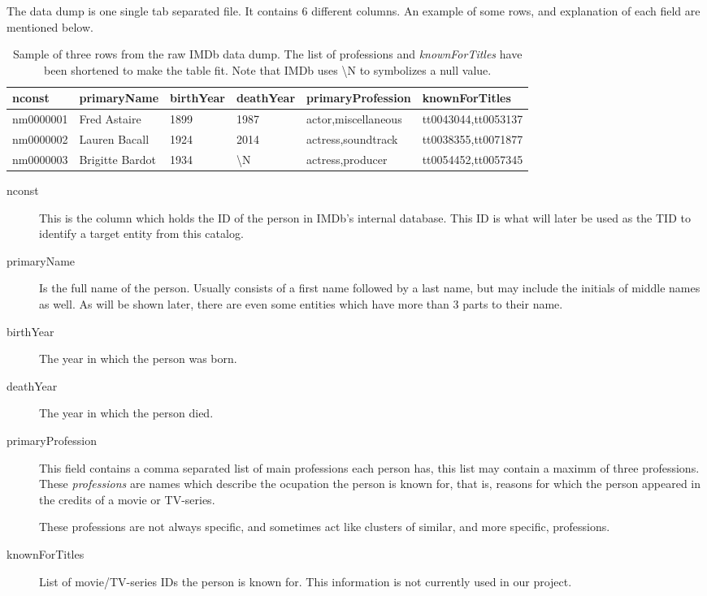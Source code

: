 \documentclass[epsfig,a4paper,11pt,titlepage,twoside,openany]{book}
\begin{document}
The data dump is one single tab separated file. It contains 6 different columns. An example of some rows, and explanation of each field are mentioned below.

\begin{table}[H]
\centering
\begin{tabular}{l|l|l|l|l|l}
nconst    & primaryName     & birthYear & deathYear         & primaryProfession              & knownForTitles                          \\ \hline
nm0000001 & Fred Astaire    & 1899      & 1987              & actor,miscellaneous & tt0043044,tt0053137 \\
nm0000002 & Lauren Bacall   & 1924      & 2014              & actress,soundtrack             & tt0038355,tt0071877 \\
nm0000003 & Brigitte Bardot & 1934      & \textbackslash{}N & actress,producer    & tt0054452,tt0057345
\end{tabular}
\caption{Sample of three rows from the raw IMDb data dump. The list of professions and \textit{knownForTitles} have been shortened to make the table fit. Note that IMDb uses \textbackslash{}N to symbolizes a null value.}
\label{tab:imdb-raw-sample}
\end{table}

\begin{description}
\item[nconst] This is the column which holds the ID of the person in IMDb's internal database. This ID is what will later be used as the TID to identify a target entity from this catalog.

\item[primaryName] Is the full name of the person. Usually consists of a first name followed by a last name, but may include the initials of middle names as well. As will be shown later, there are even some entities which have more than 3 parts to their name.

\item[birthYear] The year in which the person was born.

\item[deathYear] The year in which the person died.

\item[primaryProfession] This field contains a comma separated list of main professions each person has, this list may contain a maximm of three professions. These \textit{professions} are names which describe the ocupation the person is known for, that is, reasons for which the person appeared in the credits of a movie or TV-series. 

These professions are not always specific, and sometimes act like clusters of similar, and more specific, professions.

\item[knownForTitles] List of movie/TV-series IDs the person is known for. This information is not currently used in our project. 
\end{description}
\end{document}
